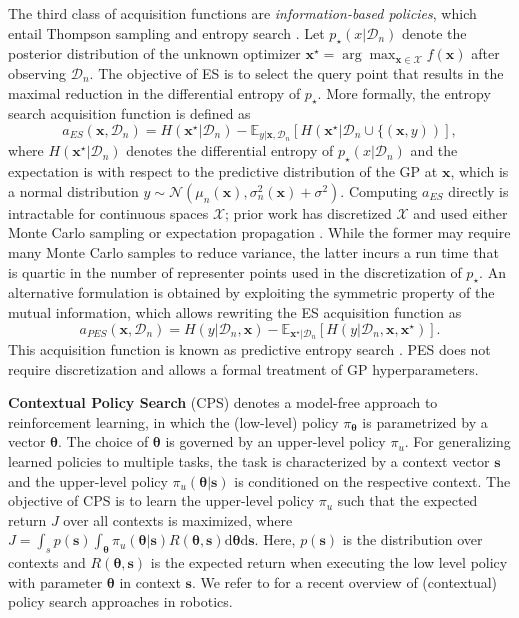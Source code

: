 \documentclass[10pt,letterpaper]{article} %
\def\D{\mathrm{d}}
\begin{document}
The third class of acquisition functions are \emph{information-based policies},
which entail Thompson sampling and entropy search
\citep[ES,][]{villemonteix_informational_2008, hennig_entropy_2012,hernandez-lobato_predictive_2014}.
Let $p_\star(x \vert \mathcal{D}_n)$ denote the
posterior distribution of the unknown optimizer $\mathbf{x}^\star = \arg\max_{\mathbf{x} \in \mathcal{X}} f(\mathbf{x})$  after
observing $\mathcal{D}_n$. The objective of ES is to select the query point that
results in the maximal reduction in the differential entropy of $p_\star$. More
formally, the entropy search acquisition function is defined as
$$ a_{ES}(\mathbf{x}, \mathcal{D}_n)
  = H(\mathbf{x}^\star \vert \mathcal{D}_n) - \mathbb{E}_{y \vert \mathbf{x}, \mathcal{D}_n}
    [H(\mathbf{x}^\star \vert \mathcal{D}_n \cup \{(\mathbf{x}, y))],$$
where $H(\mathbf{x}^\star \vert \mathcal{D}_n)$ denotes the differential entropy
of $p_\star(x \vert \mathcal{D}_n)$ and the expectation is with respect to the
predictive distribution of the GP at $\mathbf{x}$, which is a normal
distribution $y \sim \mathcal{N}(\mu_{n}(\mathbf{x}), \sigma_{n}^2(\mathbf{x}) +
\sigma^2)$. Computing $a_{ES}$ directly is intractable for continuous spaces
$\mathcal{X}$; prior work has discretized $\mathcal{X}$ and used either Monte
Carlo sampling \cite{villemonteix_informational_2008} or expectation propagation
\cite{hennig_entropy_2012}. While the former may require many Monte Carlo
samples to reduce variance, the latter incurs a run time that is quartic in the
number of representer points used in the discretization of $p_\star$. An
alternative formulation is obtained by exploiting the symmetric property of the
mutual information, which allows rewriting the ES acquisition function as
$$ a_{PES}(\mathbf{x}, \mathcal{D}_n)
  = H(y \vert \mathcal{D}_n, \mathbf{x}) - \mathbb{E}_{\mathbf{x}^\star \vert \mathcal{D}_n}
    [H(y \vert \mathcal{D}_n, \mathbf{x}, \mathbf{x}^\star)].$$
This acquisition function is known as predictive entropy search
\citep[PES,][]{hernandez-lobato_predictive_2014}. PES does not require discretization
and allows a formal treatment of GP hyperparameters.


\textbf{Contextual Policy Search} (CPS)
denotes a model-free approach to reinforcement learning,
in which the (low-level) policy $\pi_\mathbf{\theta}$ is parametrized by a vector
$\mathbf{\theta}$. The choice of $\mathbf{\theta}$ is governed by an upper-level policy
$\pi_{u}$. For generalizing learned policies to multiple tasks,
the task is characterized
by a context vector $\mathbf{s}$ and the upper-level policy
$\pi_{u}(\mathbf{\theta}\vert \mathbf{s})$ is conditioned on the respective
context. The objective of CPS is to learn the upper-level policy
$\pi_{u}$ such that the expected return $J$ over all contexts is
maximized, where $J = \int_s p(\mathbf{s}) \int_\mathbf{\theta}
\pi_{u}(\mathbf{\theta}\vert \mathbf{s}) R(\mathbf{\theta}, \mathbf{s}) \D{\mathbf{\theta}
} \D{\mathbf{s}}$. Here, $p(\mathbf{s})$ is the distribution over contexts and
$R(\mathbf{\theta}, \mathbf{s})$ is the expected return when executing the low
level policy with parameter $\mathbf{\theta}$ in context $\mathbf{s}$. We refer to
\citet{deisenroth_survey_2013} for a recent overview of (contextual) policy
search approaches in robotics.
\end{document}
